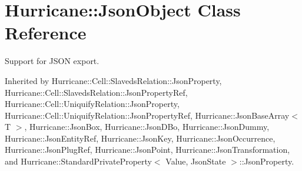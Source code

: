 \hypertarget{classHurricane_1_1JsonObject}{\section{Hurricane\-:\-:Json\-Object Class Reference}
\label{classHurricane_1_1JsonObject}
}


Support for J\-S\-O\-N export.  




Inherited by Hurricane\-::\-Cell\-::\-Slaveds\-Relation\-::\-Json\-Property, Hurricane\-::\-Cell\-::\-Slaveds\-Relation\-::\-Json\-Property\-Ref, Hurricane\-::\-Cell\-::\-Uniquify\-Relation\-::\-Json\-Property, Hurricane\-::\-Cell\-::\-Uniquify\-Relation\-::\-Json\-Property\-Ref, Hurricane\-::\-Json\-Base\-Array$<$ T $>$, Hurricane\-::\-Json\-Box, Hurricane\-::\-Json\-D\-Bo, Hurricane\-::\-Json\-Dummy, Hurricane\-::\-Json\-Entity\-Ref, Hurricane\-::\-Json\-Key, Hurricane\-::\-Json\-Occurrence, Hurricane\-::\-Json\-Plug\-Ref, Hurricane\-::\-Json\-Point, Hurricane\-::\-Json\-Transformation, and Hurricane\-::\-Standard\-Private\-Property$<$ Value, Json\-State $>$\-::\-Json\-Property.

